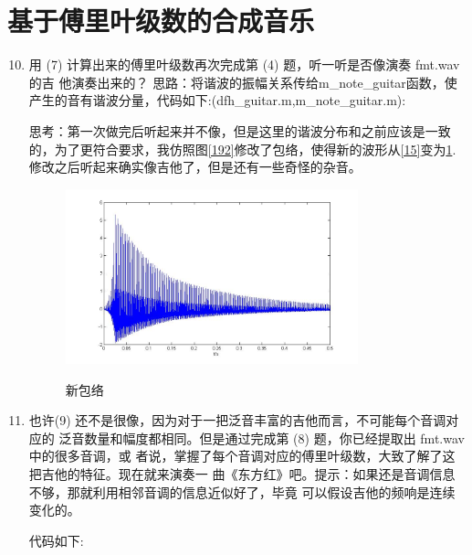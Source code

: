 \documentclass{ctexart}
\begin{document}
\section{
    基于傅里叶级数的合成音乐
}
\begin{enumerate}\setcounter{enumi}{9}
    \item{
            用 (7) 计算出来的傅里叶级数再次完成第 (4) 题，听一听是否像演奏 fmt.wav 的吉
            他演奏出来的？
        }
        思路：将谐波的振幅关系传给m\_note\_guitar函数，使产生的音有谐波分量，代码如下:(dfh\_guitar.m,m\_note\_guitar.m):

        
        

        思考：第一次做完后听起来并不像，但是这里的谐波分布和之前应该是一致的，为了更符合要求，我仿照图\ref{192}修改了包络，使得新的波形从\ref{15}变为\ref{110}.修改之后听起来确实像吉他了，但是还有一些奇怪的杂音。
        \begin{figure}
            \centering
            \includegraphics[width=0.8\textwidth]{fmt/1_10.jpg}\\
            \caption{新包络\label{110}}
        \end{figure}

    \item{
            也许(9) 还不是很像，因为对于一把泛音丰富的吉他而言，不可能每个音调对应的
            泛音数量和幅度都相同。但是通过完成第 (8) 题，你已经提取出 fmt.wav 中的很多音调，或
            者说，掌握了每个音调对应的傅里叶级数，大致了解了这把吉他的特征。现在就来演奏一
            曲《东方红》吧。提示：如果还是音调信息不够，那就利用相邻音调的信息近似好了，毕竟
            可以假设吉他的频响是连续变化的。
        }        

        代码如下:
        


\end{enumerate}
\end{document}
